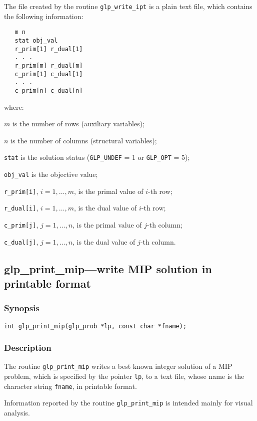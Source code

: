 The file created by the routine \verb|glp_write_ipt| is a plain text
file, which contains the following information:

\begin{verbatim}
   m n
   stat obj_val
   r_prim[1] r_dual[1]
   . . .
   r_prim[m] r_dual[m]
   c_prim[1] c_dual[1]
   . . .
   c_prim[n] c_dual[n]
\end{verbatim}

\noindent
where:

\noindent
$m$ is the number of rows (auxiliary variables);

\noindent
$n$ is the number of columns (structural variables);

\noindent
\verb|stat| is the solution status (\verb|GLP_UNDEF| = 1 or
\verb|GLP_OPT| = 5);

\noindent
\verb|obj_val| is the objective value;

\noindent
\verb|r_prim[i]|, $i=1,\dots,m$, is the primal value of $i$-th row;

\noindent
\verb|r_dual[i]|, $i=1,\dots,m$, is the dual value of $i$-th row;

\noindent
\verb|c_prim[j]|, $j=1,\dots,n$, is the primal value of $j$-th column;

\noindent
\verb|c_dual[j]|, $j=1,\dots,n$, is the dual value of $j$-th column.

\subsection{glp\_print\_mip---write MIP solution in printable format}

\subsubsection*{Synopsis}

\begin{verbatim}
int glp_print_mip(glp_prob *lp, const char *fname);
\end{verbatim}

\subsubsection*{Description}

The routine \verb|glp_print_mip| writes a best known integer solution
of a MIP problem, which is specified by the pointer \verb|lp|, to a text
file, whose name is the character string \verb|fname|, in printable
format.

Information reported by the routine \verb|glp_print_mip| is intended
mainly for visual analysis.

